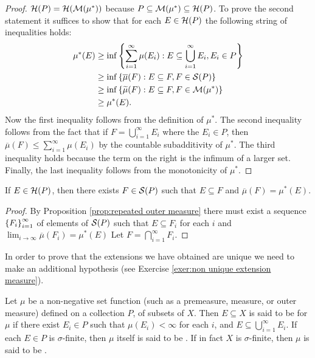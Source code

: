 \begin{proof}

${\cal H}(P)={\cal H}({\cal M}(\mu^*))$ because $P\subseteq{\cal M}(\mu^*)\subseteq{\cal H}(P)$. To prove the second statement it suffices to show that for each $E\in{\cal H}(P)$ the following string of inequalities holds:
\begin{align*}
    \mu^*(E)&\geq\inf\left\{\sum_{i=1}^\infty\mu(E_i):E\subseteq\bigcup_{i=1}^\infty E_i,E_i\in P\right\}\\
            &\geq\inf\left\{\overline{\mu}(F):E\subseteq F,F\in{\cal S}(P)\right\}\\
            &\geq\inf\left\{\widetilde{\mu}(F):E\subseteq F,F\in{\cal M}(\mu^*)\right\}\\
            &\geq\mu^*(E).
\end{align*}
Now the first inequality follows from the definition of $\mu^*$. The second inequality follows from the fact that if $F=\bigcup_{i=1}^\infty E_i$ where the $E_i\in P$, then $\overline{\mu}(F)\leq\sum_{i=1}^\infty\mu(E_i)$ by the countable subadditivity of $\mu^*$. The third inequality holds because the term on the right is the infimum of a larger set. Finally, the last inequality follows from the monotonicity of $\mu^*$.
\end{proof}

\begin{corollary}\label{cor:measure of hereditary wrt outer measure}
If $E\in{\cal H}(P)$, then there exists $F\in{\cal S}(P)$ such that $E\subseteq F$ and $\overline{\mu}(F)=\mu^*(E)$.
\end{corollary}

\begin{proof}
By Proposition \ref{prop:repeated outer measure} there must exist a sequence $\left\{F_i\right\}_{i=1}^\infty$ of elements of ${\cal S}(P)$ such that $E\subseteq F_i$ for each $i$ and $\lim _{i\to\infty}\overline{\mu}(F_i)=\mu^*(E)$ Let $F=\bigcap_{i=1}^\infty F_i$.
\end{proof}

In order to prove that the extensions we have obtained are unique we need to make an additional hypothesis (see Exercise \ref{exer:non unique extension measure}).

\begin{definition}
Let $\mu$ be a non-negative set function (such as a premeasure, measure, or outer measure) defined on a collection $P$, of subsets of $X$. Then $E\subseteq X$ is said to be  for $\mu$ if there exist $E_i\in P$ such that $\mu(E_i)<\infty$ for each $i$, and $E\subseteq\bigcup_{i=1}^\infty E_i$. If each $E\in P$ is $\sigma$-finite, then $\mu$ itself is said to be . If in fact $X$ is $\sigma$-finite, then $\mu$ is said to be .
\end{definition}

